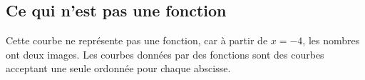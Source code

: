 %




\subsection{Ce qui n'est pas une fonction}


\begin{multicols}{2}
    Cette courbe ne représente pas une fonction, car à partir de \( x=-4\), les nombres ont deux images. Les courbes données par des fonctions sont des courbes acceptant une seule ordonnée pour chaque abscisse.

\columnbreak




\end{multicols}
